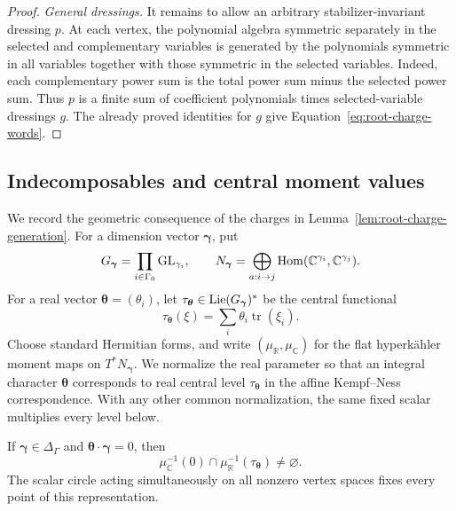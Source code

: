 \begin{proof}
\emph{General dressings.}
It remains to allow an arbitrary stabilizer-invariant dressing \(p\).
At each vertex, the polynomial algebra symmetric separately in the
selected and complementary variables is generated by the polynomials
symmetric in all variables together with those symmetric in the
selected variables.  Indeed, each complementary power sum is the total
power sum minus the selected power sum.  Thus \(p\) is a finite sum
of coefficient polynomials times selected-variable dressings \(g\).
The already proved identities for \(g\) give
Equation~\eqref{eq:root-charge-words}.
\end{proof}

\subsection{Indecomposables and central moment values}

We record the geometric consequence of the charges in
Lemma~\ref{lem:root-charge-generation}.  For a dimension vector
\(\boldsymbol\gamma\), put
\[
 G_{\boldsymbol\gamma}=\prod_{i\in\Gamma_0}\operatorname{GL}_{\gamma_i},
 \qquad
 N_{\boldsymbol\gamma}=\bigoplus_{a:i\to j}
                     \operatorname{Hom}(\mathbb C^{\gamma_i},\mathbb C^{\gamma_j}).
\]
For a real vector \(\boldsymbol\theta=(\theta_i)\), let
\(\tau_{\boldsymbol\theta}\in\operatorname{Lie}(G_{\boldsymbol\gamma})^*\)
be the central functional
\[
 \tau_{\boldsymbol\theta}(\xi)
       =\sum_i\theta_i\operatorname{tr}(\xi_i).
\]
Choose standard Hermitian forms, and write
\((\mu_{\mathbb R},\mu_{\mathbb C})\) for the flat hyperkähler moment
maps on \(T^*N_{\boldsymbol\gamma}\).  We normalize the real parameter
so that an integral character \(\boldsymbol\theta\) corresponds to
real central level \(\tau_{\boldsymbol\theta}\) in the affine
Kempf--Ness correspondence.  With any other common normalization,
the same fixed scalar multiplies every level below.

\begin{lemma}\label{lem:root-moment}
If \(\boldsymbol\gamma\in\Delta_\Gamma\) and
\(\boldsymbol\theta\cdot\boldsymbol\gamma=0\), then
\[
 \mu_{\mathbb C}^{-1}(0)\cap
 \mu_{\mathbb R}^{-1}(\tau_{\boldsymbol\theta})\ne\varnothing.
\]
The scalar circle acting simultaneously on all nonzero vertex spaces
fixes every point of this representation.
\end{lemma}

